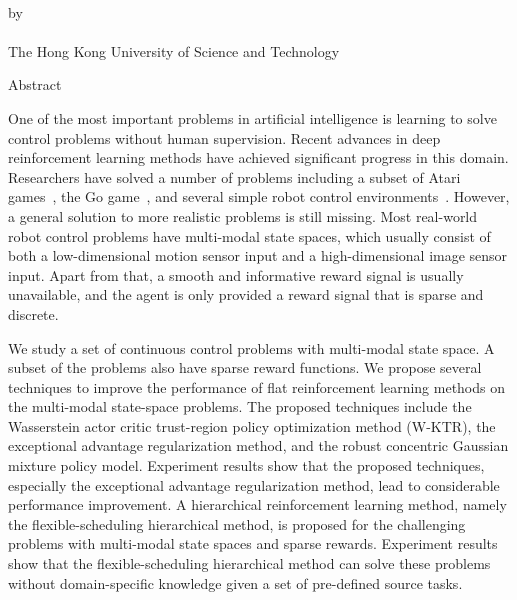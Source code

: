 \begin{center}
{\Large \thesistitle}\\
\vspace{20mm}
by \thesisauthor\\
\vspace{15mm}
\departmentname\\
\vspace{10mm}
The Hong Kong University of Science and Technology
\end{center}
\vspace{8mm}
\begin{center}
Abstract
\end{center}
One of the most important problems in artificial intelligence is learning to solve control problems without human supervision. Recent advances in deep reinforcement learning methods have achieved significant progress in this domain. Researchers have solved a number of problems including a subset of Atari games~\cite{mnih2015human}, the Go game~\cite{silver2016mastering}, and several simple robot control environments~\cite{duan2016benchmarking}.  However, a general solution to more realistic problems is still missing. Most real-world robot control problems have multi-modal state spaces, which usually consist of both a low-dimensional motion sensor input and a high-dimensional image sensor input. Apart from that, a smooth and informative reward signal is usually unavailable, and the agent is only provided a reward signal that is sparse and discrete.

We study a set of continuous control problems with multi-modal state space. A subset of the problems also have sparse reward functions. We propose several techniques to improve the performance of flat reinforcement learning methods on the multi-modal state-space problems. The proposed techniques include the Wasserstein actor critic trust-region policy optimization method (W-KTR), the exceptional advantage regularization method, and the robust concentric Gaussian mixture policy model. Experiment results show that the proposed techniques, especially the exceptional advantage regularization method, lead to considerable performance improvement. A hierarchical reinforcement learning method, namely the flexible-scheduling hierarchical method, is proposed for the challenging problems with multi-modal state spaces and sparse rewards. Experiment results show that the flexible-scheduling hierarchical method can solve these problems without domain-specific knowledge given a set of pre-defined source tasks.

\par
\noindent


